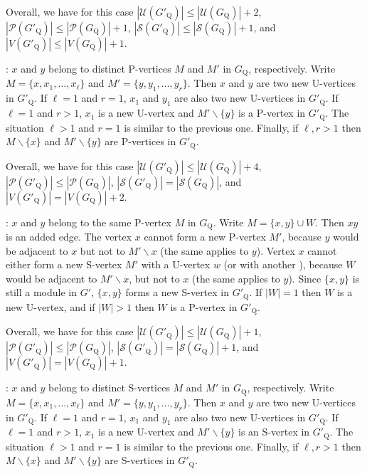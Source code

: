 \documentclass[12pt]{article}
\begin{document}
Overall, we have for this case
$|{\mathcal U}(G'_{\mathrm Q})| \leq |{\mathcal U}(G_{\mathrm Q})| + 2$,
$|{\mathcal P}(G'_{\mathrm Q})| \leq |{\mathcal P}(G_{\mathrm Q})|+1$,
$|{\mathcal S}(G'_{\mathrm Q})| \leq |{\mathcal S}(G_{\mathrm Q})|+1$, and
$|V(G'_{\mathrm Q})| \leq |V(G_{\mathrm Q})| + 1$.

\medskip

: $x$ and $y$ belong to distinct P-vertices
$M$ and $M'$ in $G_{\mathrm Q}$, respectively.
Write $M=\{x,x_1,\ldots,x_{\ell}\}$ and $M'=\{y,y_1,\ldots,y_r\}$. Then $x$ and $y$ are two new U-vertices in $G'_{\mathrm Q}$. If $\ell=1$ and $r=1$, $x_1$ and $y_1$ are also two new U-vertices in $G'_{\mathrm Q}$. If $\ell=1$ and $r>1$, $x_1$ is a new U-vertex and $M' \backslash \{y\}$ is a P-vertex in $G'_{\mathrm Q}$. The situation $\ell>1$ and $r=1$ is similar to the previous one. Finally, if $\ell,r >1$ then $M \backslash \{x\}$ and $M' \backslash \{y\}$ are P-vertices in $G'_{\mathrm Q}$.

Overall,
we have for this case
$|{\mathcal U}(G'_{\mathrm Q})| \leq |{\mathcal U}(G_{\mathrm Q})|+4$,
$|{\mathcal P}(G'_{\mathrm Q})| \leq |{\mathcal P}(G_{\mathrm Q})|$,
$|{\mathcal S}(G'_{\mathrm Q})| = |{\mathcal S}(G_{\mathrm Q})|$, and
$|V(G'_{\mathrm Q})|=|V(G_{\mathrm Q})|+2.$

\medskip


: $x$ and $y$ belong to the same P-vertex $M$ in $G_{\mathrm Q}$.
Write $M=\{x,y\} \cup W$. Then $xy$ is an added edge. The vertex $x$ cannot form a new P-vertex $M'$, because $y$ would be adjacent to $x$ but not to $M' \backslash x$ (the same applies to $y$). Vertex $x$ cannot either form a new S-vertex $M'$ with a U-vertex $w$ (or with another ), because $W$ would be adjacent to $M'\backslash x$, but not to $x$ (the same applies to $y$). Since $\{x,y\}$ is still a module in $G'$, $\{x,y\}$  forms a new S-vertex in $G'_{\mathrm Q}$. If $|W|=1$ then $W$ is a new U-vertex, and if $|W|>1$ then $W$ is a P-vertex in $G'_{\mathrm Q}$.

Overall,
we have for this case
$|{\mathcal U}(G'_{\mathrm Q})| \leq |{\mathcal U}(G_{\mathrm Q})|+1$,
$|{\mathcal P}(G'_{\mathrm Q})| \leq |{\mathcal P}(G_{\mathrm Q})|$,
$|{\mathcal S}(G'_{\mathrm Q})| = |{\mathcal S}(G_{\mathrm Q})|+1$, and
$|V(G'_{\mathrm Q})|=|V(G_{\mathrm Q})|+1.$

\medskip

: $x$ and $y$ belong to distinct S-vertices
$M$ and $M'$ in $G_{\mathrm Q}$, respectively.
Write $M=\{x,x_1,\ldots,x_{\ell}\}$ and $M'=\{y,y_1,\ldots,y_r\}$. Then $x$ and $y$ are two new U-vertices in $G'_{\mathrm Q}$. If $\ell=1$ and $r=1$, $x_1$ and $y_1$ are also two new U-vertices in $G'_{\mathrm Q}$. If $\ell=1$ and $r>1$, $x_1$ is a new U-vertex and $M' \backslash \{y\}$ is an S-vertex in $G'_{\mathrm Q}$. The situation $\ell>1$ and $r=1$ is similar to the previous one. Finally, if $\ell,r >1$ then $M \backslash \{x\}$ and $M' \backslash \{y\}$ are S-vertices in $G'_{\mathrm Q}$.
\end{document}

